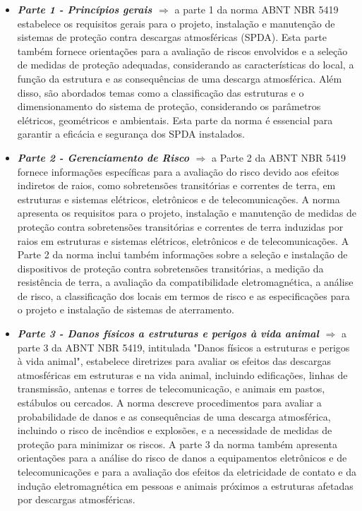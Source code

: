 \documentclass[a4paper, 12pt, onecolumn,singlespacing]{article}
\begin{document}
		\begin{itemize}
			\item \textbf{\textit{Parte 1 - Princípios gerais $\Rightarrow$ }}a parte 1 da norma ABNT NBR 5419 estabelece os requisitos gerais para o projeto, instalação e manutenção de sistemas de proteção contra descargas atmosféricas (SPDA). Esta parte também fornece orientações para a avaliação de riscos envolvidos e a seleção de medidas de proteção adequadas, considerando as características do local, a função da estrutura e as consequências de uma descarga atmosférica. Além disso, são abordados temas como a classificação das estruturas e o dimensionamento do sistema de proteção, considerando os parâmetros elétricos, geométricos e ambientais. Esta parte da norma é essencial para garantir a eficácia e segurança dos SPDA instalados.
			\item \textbf{\textit{Parte 2 - Gerenciamento de Risco $\Rightarrow$ }}a Parte 2 da ABNT NBR 5419 fornece informações específicas para a avaliação do risco devido aos efeitos indiretos de raios, como sobretensões transitórias e correntes de terra, em estruturas e sistemas elétricos, eletrônicos e de telecomunicações. A norma apresenta os requisitos para o projeto, instalação e manutenção de medidas de proteção contra sobretensões transitórias e correntes de terra induzidas por raios em estruturas e sistemas elétricos, eletrônicos e de telecomunicações. A Parte 2 da norma inclui também informações sobre a seleção e instalação de dispositivos de proteção contra sobretensões transitórias, a medição da resistência de terra, a avaliação da compatibilidade eletromagnética, a análise de risco, a classificação dos locais em termos de risco e as especificações para o projeto e instalação de sistemas de aterramento.
			\item \textbf{\textit{Parte 3 - Danos físicos a estruturas e perigos à vida animal $\Rightarrow$ }}a parte 3 da ABNT NBR 5419, intitulada "Danos físicos a estruturas e perigos à vida animal", estabelece diretrizes para avaliar os efeitos das descargas atmosféricas em estruturas e na vida animal, incluindo edificações, linhas de transmissão, antenas e torres de telecomunicação, e animais em pastos, estábulos ou cercados. A norma descreve procedimentos para avaliar a probabilidade de danos e as consequências de uma descarga atmosférica, incluindo o risco de incêndios e explosões, e a necessidade de medidas de proteção para minimizar os riscos. A parte 3 da norma também apresenta orientações para a análise do risco de danos a equipamentos eletrônicos e de telecomunicações e para a avaliação dos efeitos da eletricidade de contato e da indução eletromagnética em pessoas e animais próximos a estruturas afetadas por descargas atmosféricas.

\end{itemize}
\end{document}
